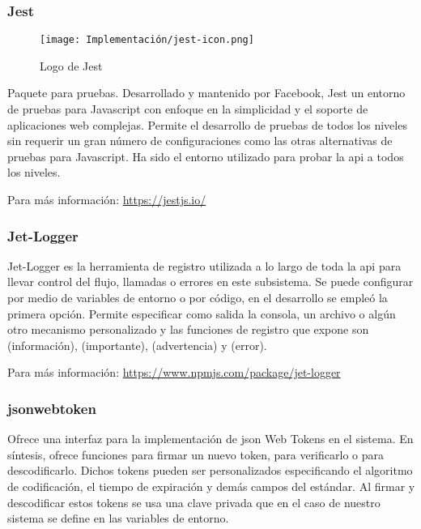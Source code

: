 \subsubsection{Jest}
\label{lib:api:jest}

\begin{wrapfigure}[6]{r}{0.2\textwidth}
    \vspace{-20pt}
    \centering
    \texttt{[image: Implementación/jest-icon.png]}
    \vspace{-15pt}
    \caption{Logo de Jest}
\end{wrapfigure}

Paquete para pruebas. Desarrollado y mantenido por Facebook, Jest un entorno de pruebas para Javascript con enfoque en la simplicidad y el soporte de aplicaciones web complejas. Permite el desarrollo de pruebas de todos los niveles sin requerir un gran número de configuraciones como las otras alternativas de pruebas para Javascript. Ha sido el entorno utilizado para probar la \gls{api} a todos los niveles.

Para más información: \href{https://jestjs.io/}{https://jestjs.io/}

\subsubsection{Jet-Logger}
\label{lib:api:jet_logger}

Jet-Logger es la herramienta de registro utilizada a lo largo de toda la \acrshort{api} para llevar control del flujo, llamadas o errores en este subsistema. Se puede configurar por medio de variables de entorno o por código, en el desarrollo se empleó la primera opción. Permite especificar como salida la consola, un archivo o algún otro mecanismo personalizado y las funciones de registro que expone son  (información),  (importante),  (advertencia) y  (error).

Para más información: \href{https://www.npmjs.com/package/jet-logger}{https://www.npmjs.com/package/jet-logger}

\subsubsection{jsonwebtoken}
\label{lib:api:jsonwebtoken}

Ofrece una interfaz para la implementación de \acrshort{json} Web Tokens\cite{rfc7519} en el sistema. En síntesis, ofrece funciones para firmar un nuevo \gls{token}, para verificarlo o para descodificarlo. Dichos \glspl{token} pueden ser personalizados especificando el algoritmo de codificación, el tiempo de expiración y demás campos del estándar. Al firmar y descodificar estos \glspl{token} se usa una clave privada que en el caso de nuestro sistema se define en las variables de entorno.

